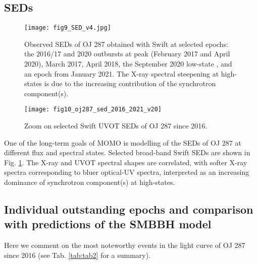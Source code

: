 \documentclass[preprints,article,accept,moreauthors,pdftex]{Definitions/mdpi}
\begin{document}
{\subsection{SEDs}

\begin{figure}
\begin{center}
\texttt{[image: fig9\_SED\_v4.jpg]}
\caption{Observed SEDs of OJ 287 obtained with Swift at selected epochs: the 2016/17 and 2020 outbursts at peak (February 2017 and April 2020), March 2017, April 2018,  
the September 2020 low-state \citep{Komossa2021a}, and an epoch from January 2021.  The X-ray spectral steepening at high-states is due to the increasing contribution of the synchrotron component(s).  
}
\label{fig:Swift_SEDs}
\end{center}
\end{figure}

\begin{figure}
\begin{center}
\texttt{[image: fig10\_oj287\_sed\_2016\_2021\_v20]}
\caption{Zoom on selected Swift UVOT SEDs  of OJ 287 since 2016. 
}
\label{fig:Swift_SEDs_UVOT}
\end{center}
\end{figure}

One of the long-term goals of MOMO is modelling of the SEDs of OJ 287 at different flux and spectral states. Selected broad-band Swift SEDs are shown in Fig. \ref{fig:Swift_SEDs}. 
The X-ray and UVOT spectral shapes are correlated, with softer X-ray spectra corresponding to bluer optical-UV spectra, interpreted as an increasing dominance of synchrotron component(s) at high-states.

\subsection{Individual outstanding epochs and comparison with  predictions of the SMBBH model}

Here we comment on the most noteworthy events in the light curve of OJ 287 since 2016 (see Tab. \ref{tab:tab2} for a summary).

}
\end{document}
